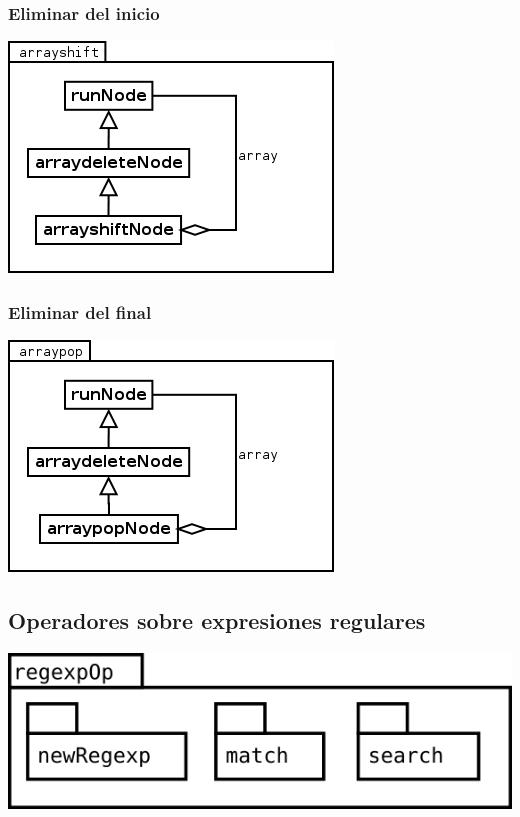 \subsubsection {Eliminar del inicio}
\begin{center}
\includegraphics[scale=0.4]{shift.png} \\
\end{center}

\subsubsection {Eliminar del final}
\begin{center}
\includegraphics[scale=0.4]{pop.png} \\
\end{center}




\pagebreak
\subsection {Operadores sobre expresiones regulares}
\begin{center}
\includegraphics[scale=0.4]{regexpOp-package.png} \\
\end{center}

